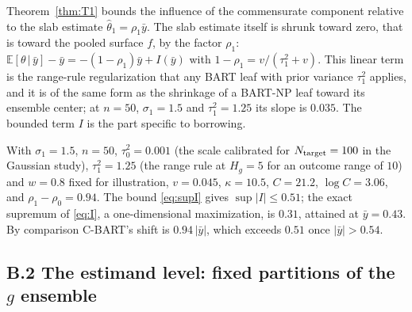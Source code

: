 \documentclass[11pt]{article}
\newcommand{\E}{\mathbb{E}}
\newcommand{\given}{\,\vert\,}
\theoremstyle{definition}
\theoremstyle{plain}
\begin{document}
{\begin{remA}\label{rem:slabshrink}
Theorem~\ref{thm:T1} bounds the influence of the commensurate component relative to the slab estimate $\hat\theta_1=\rho_1\bar y$. The slab estimate itself is shrunk toward zero, that is toward the pooled surface $f$, by the factor $\rho_1$: $\E[\theta\given\bar y]-\bar y=-(1-\rho_1)\bar y+I(\bar y)$ with $1-\rho_1=v/(\tau_1^2+v)$. This linear term is the range-rule regularization that any BART leaf with prior variance $\tau_1^2$ applies, and it is of the same form as the shrinkage of a BART-NP leaf toward its ensemble center; at $n=50$, $\sigma_1=1.5$ and $\tau_1^2=1.25$ its slope is $0.035$. The bounded term $I$ is the part specific to borrowing.
\end{remA}

\begin{remA}\label{rem:T1num}
With $\sigma_1=1.5$, $n=50$, $\tau_0^2=0.001$ (the scale calibrated for $N_{\rm target}=100$ in the Gaussian study), $\tau_1^2=1.25$ (the range rule at $H_g=5$ for an outcome range of $10$) and $w=0.8$ fixed for illustration, $v=0.045$, $\kappa=10.5$, $C=21.2$, $\log C=3.06$, and $\rho_1-\rho_0=0.94$. The bound \eqref{eq:supI} gives $\sup|I|\le0.51$; the exact supremum of \eqref{eq:I}, a one-dimensional maximization, is $0.31$, attained at $\bar y=0.43$. By comparison C-BART's shift is $0.94\,|\bar y|$, which exceeds $0.51$ once $|\bar y|>0.54$.
\end{remA}

\subsection*{B.2 The estimand level: fixed partitions of the $g$ ensemble}

}
\end{document}
